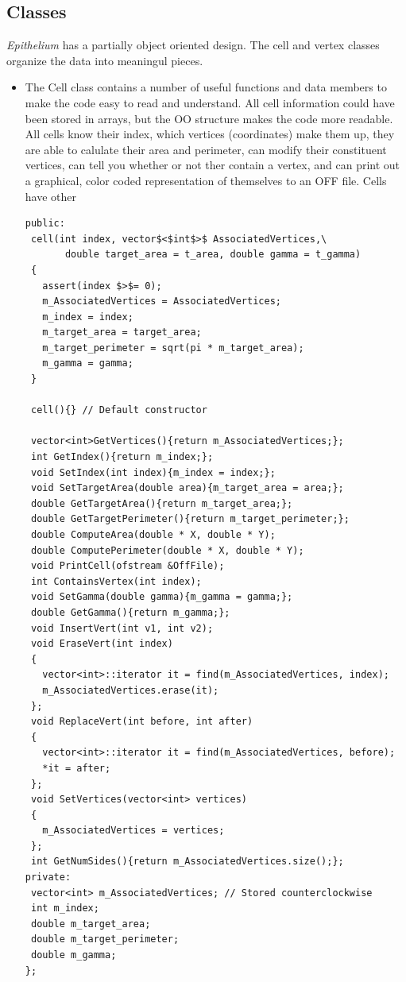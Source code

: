 \subsection{Classes}
\emph{Epithelium} has a partially object oriented design. The cell and vertex classes organize the data into meaningul pieces.
\begin{itemize}
\item The {\color{red} Cell} class contains a number of useful functions and data members to make the code easy to read and understand. All cell information could have been stored in arrays, but the OO structure makes the code more readable. All cells know their index, which vertices (coordinates) make them up, they are able to calulate their area and perimeter, can modify their constituent vertices, can tell you whether or not ther contain a vertex, and can print out a graphical, color coded representation of themselves to an OFF file. Cells have other 
\begin{lstlisting}
public:
 cell(int index, vector$<$int$>$ AssociatedVertices,\
       double target_area = t_area, double gamma = t_gamma)
 {	
   assert(index $>$= 0);
   m_AssociatedVertices = AssociatedVertices;
   m_index = index;
   m_target_area = target_area;
   m_target_perimeter = sqrt(pi * m_target_area);
   m_gamma = gamma; 
 }
	
 cell(){} // Default constructor
	
 vector<int>GetVertices(){return m_AssociatedVertices;};
 int GetIndex(){return m_index;};
 void SetIndex(int index){m_index = index;};
 void SetTargetArea(double area){m_target_area = area;};
 double GetTargetArea(){return m_target_area;};
 double GetTargetPerimeter(){return m_target_perimeter;};
 double ComputeArea(double * X, double * Y);
 double ComputePerimeter(double * X, double * Y);
 void PrintCell(ofstream &OffFile);
 int ContainsVertex(int index);
 void SetGamma(double gamma){m_gamma = gamma;};
 double GetGamma(){return m_gamma;};
 void InsertVert(int v1, int v2);
 void EraseVert(int index)
 {
   vector<int>::iterator it = find(m_AssociatedVertices, index); 
   m_AssociatedVertices.erase(it);
 };
 void ReplaceVert(int before, int after)
 {
   vector<int>::iterator it = find(m_AssociatedVertices, before); 
   *it = after;
 };
 void SetVertices(vector<int> vertices)
 {
   m_AssociatedVertices = vertices;
 };
 int GetNumSides(){return m_AssociatedVertices.size();};
private:
 vector<int> m_AssociatedVertices; // Stored counterclockwise
 int m_index;	
 double m_target_area;
 double m_target_perimeter;
 double m_gamma;
};


\end{lstlisting}
\end{itemize}
